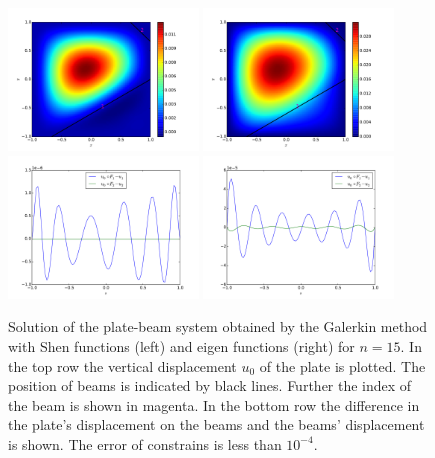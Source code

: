 \documentclass{marine_2015}
\begin{document}
 \begin{figure}[t!]
 \centering
 \includegraphics[width=0.45\textwidth]{img/shen_u0}
 \includegraphics[width=0.45\textwidth]{img/sine_u0}\\
 \includegraphics[width=0.45\textwidth]{img/shen_u0_ur}
 \includegraphics[width=0.45\textwidth]{img/sine_u0_ur}\\
 \caption{
  Solution of the plate-beam system obtained by the Galerkin method with Shen
  functions (left) and eigen functions (right) for $n=15$. In the top row the vertical
  displacement $u_0$ of the plate is plotted. The position of beams is indicated
  by black lines. Further the index of the beam is shown in magenta. In the
  bottom row the difference in the plate's displacement on the beams and the
  beams' displacement is shown. The error of constrains is less than $10^{-4}$.
 }
 \label{fig:solutions}
 \end{figure}
\end{document}
